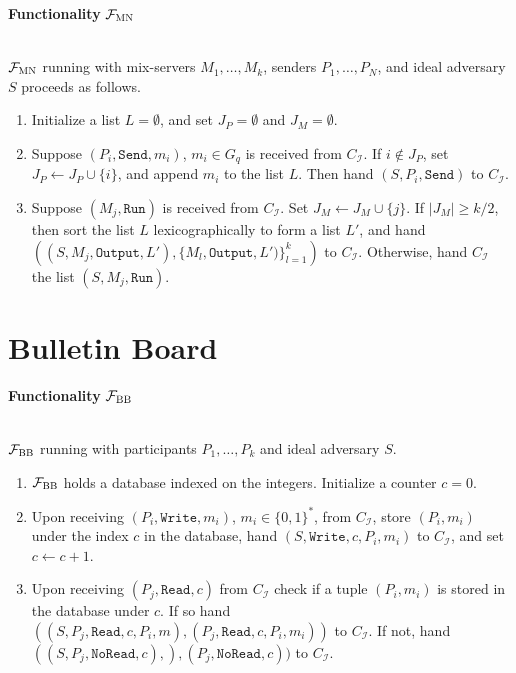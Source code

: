 \documentclass[a4paper]{article}
\newcommand{\F}{\mathcal{F}}
\begin{document}
\begin{framed}
    \centerline{\textbf{Functionality} $\F_{\textsc{MN}}$}
    \ \\
    \noindent $\F_{\textsc{MN}}$ running with mix-servers $M_1, \ldots, M_k$, senders $P_1, \ldots, P_N$, and ideal adversary $S$ proceeds as follows.
    
    \begin{enumerate}
        \item Initialize a list $L = \emptyset$, and set $J_P = \emptyset$ and $J_M = \emptyset$.
        \item Suppose $(P_i, \texttt{Send}, m_i)$, $m_i \in G_q$ is received from $C_\mathcal{I}$. If $i \not \in J_P$, set $J_P \leftarrow J_P \cup \{i\}$, and append $m_i$ to the list $L$. Then hand $(S, P_i, \texttt{Send})$ to $C_\mathcal{I}$.
        \item Suppose $(M_j, \texttt{Run})$ is received from $C_\mathcal{I}$. Set $J_M \leftarrow J_M \cup \{j\}$. If $|J_M| \geq k/2$, then sort the list $L$ lexicographically to form a list $L'$, and hand $((S, M_j, \texttt{Output}, L'), {\{M_l, \texttt{Output}, L')\}}^{k}_{l=1})$ to $C_\mathcal{I}$. Otherwise, hand $C_\mathcal{I}$ the list $(S, M_j, \texttt{Run})$.
    \end{enumerate}
\end{framed}

\section{Bulletin Board~\cite{wikstrom2004universally}}

\begin{framed}
    \centerline{\textbf{Functionality} $\F_{\textsc{BB}}$}
    \ \\
    \noindent $\F_{\textsc{BB}}$ running with participants $P_1, \ldots, P_k$ and ideal adversary $S$.
    
    \begin{enumerate}
        \item $\F_{\textsc{BB}}$ holds a database indexed on the integers. Initialize a counter $c = 0$.
        \item Upon receiving $(P_i, \texttt{Write}, m_i)$, $m_i \in {\{0, 1\}}^*$, from $C_\mathcal{I}$, store $(P_i, m_i)$ under the index $c$ in the database, hand $(S, \texttt{Write}, c, P_i, m_i)$ to $C_\mathcal{I}$, and set $c \leftarrow c + 1$.
        \item Upon receiving $(P_j, \texttt{Read}, c)$ from $C_\mathcal{I}$ check if a tuple $(P_i, m_i)$ is stored in the database under $c$. If so hand $((S, P_j, \texttt{Read}, c, P_i, m),(P_j, \texttt{Read}, c, P_i, m_i))$ to $C_\mathcal{I}$. If not, hand $((S, P_j, \texttt{NoRead},c),), (P_j, \texttt{NoRead}, c))$ to $C_\mathcal{I}$.
    \end{enumerate}
\end{framed}
\end{document}
